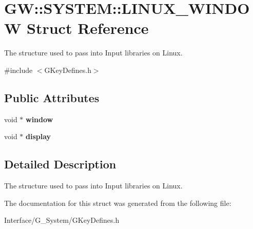 \hypertarget{structGW_1_1SYSTEM_1_1LINUX__WINDOW}{}\section{GW\+::S\+Y\+S\+T\+EM\+::L\+I\+N\+U\+X\+\_\+\+W\+I\+N\+D\+OW Struct Reference}
\label{structGW_1_1SYSTEM_1_1LINUX__WINDOW}


The structure used to pass into Input libraries on Linux.  




{\ttfamily \#include $<$G\+Key\+Defines.\+h$>$}

\subsection*{Public Attributes}
\begin{DoxyCompactItemize}
\item 
\mbox{\label{structGW_1_1SYSTEM_1_1LINUX__WINDOW_a9d4ffe1d048716af5f2d1fe3595b6b99}} 
void $\ast$ {\bfseries window}
\item 
\mbox{\label{structGW_1_1SYSTEM_1_1LINUX__WINDOW_ae68b93065e8ebd9de010f42ccf688ac5}} 
void $\ast$ {\bfseries display}
\end{DoxyCompactItemize}


\subsection{Detailed Description}
The structure used to pass into Input libraries on Linux. 

The documentation for this struct was generated from the following file\+:\begin{DoxyCompactItemize}
\item 
Interface/\+G\+\_\+\+System/G\+Key\+Defines.\+h\end{DoxyCompactItemize}
